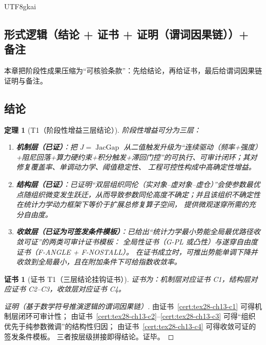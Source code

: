 \documentclass[12pt]{article}
\newtheorem{theorem}{定理}[section]
\newtheorem{Certificate}{证书}[section]
\newcommand{\JacGap}{\operatorname{JacGap}}
\begin{document}
\begin{CJK*}{UTF8}{gkai}
\subsection{形式逻辑（结论 + 证书 + 证明（谓词因果链））+ 备注}
\label{subsec:tex28-ch13-logic-structure}

本章把阶段性成果压缩为“可核验条款”：先给结论，再给证书，最后给谓词因果链证明与备注。

\subsection{结论}
\label{subsec:tex28-ch13-conclusion}

\begin{theorem}[T1（阶段性增益三层结论）]
\label{thm:tex28-ch13-t1}
阶段性增益可分为三层：
\begin{enumerate}
  \item \textbf{机制层（已证）}：把 $J=\JacGap$ 从二值触发升级为“连续驱动（频率+强度）+阻尼回落+算力硬约束+积分触发+滞回门控”的可执行、可审计闭环；其对修复覆盖率、单调动力学、阈值稳定性、
    工程可控性构成中高确定性增益。
  \item \textbf{结构层（已证）}：已证明“双层组织同伦（实对象--虚对象--虚仓）”会使参数最优点随组织微变发生跃迁，从而导致参数同伦高度不确定；并且该组织不确定性在统计力学动力框架下等价于扩展总修复算子空间，
    提供微观遂穿所需的充分自由度。
  \item \textbf{收敛层（已证为可签发条件模板）}：已给出“统计力学最小势能全局最优路径收敛可证”的两类可审计证书模板：
  全局性证书（G-PL 或凸性）与遂穿自由度证书（F-ANGLE + F-NOSTALL）。
  在证书成立时，可推出势能单调下降并收敛到全局最小，且在附加条件下可给指数收敛率。
\end{enumerate}
\end{theorem}

\begin{Certificate}[证书 T1（三层结论挂钩证书）]
\label{cert:tex28-ch13-t1}
证书为：机制层对应证书 C1，结构层对应证书 C2--C3，收敛层对应证书 C4。
\end{Certificate}

\begin{proof}[证明（基于数学符号推演逻辑的谓词因果链）]
由证书~\ref{cert:tex28-ch13-c1} 可得机制层闭环可审计性；
由证书~\ref{cert:tex28-ch13-c2}--\ref{cert:tex28-ch13-c3} 可得“组织优先于纯参数微调”的结构性归因；
由证书~\ref{cert:tex28-ch13-c4} 可得收敛可证的签发条件模板。
三者按层级拼接即得结论。证毕。
\end{proof}


\end{CJK*}
\end{document}
